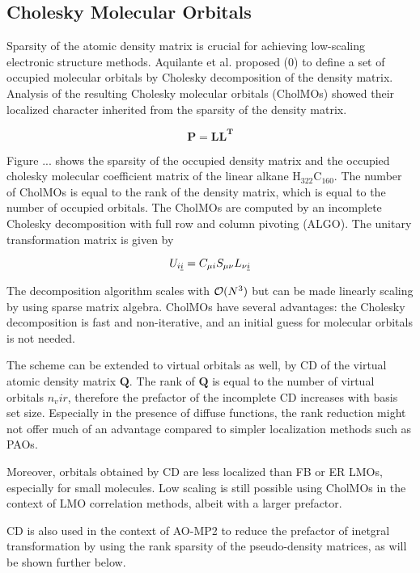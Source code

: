 \subsection{Cholesky Molecular Orbitals}

Sparsity of the atomic density matrix is crucial for achieving low-scaling electronic structure methods. Aquilante et al. proposed (0) to define a set of occupied molecular orbitals by Cholesky decomposition of the density matrix. Analysis of the resulting Cholesky molecular orbitals (CholMOs) showed their localized character inherited from the sparsity of the density matrix.

\begin{equation}
\mathbf{P} = \mathbf{LL^T}
\end{equation}

Figure ... shows the sparsity of the occupied density matrix and the occupied cholesky molecular coefficient matrix of the linear alkane H$_{322}$C$_{160}$. The number of CholMOs is equal to the rank of the density matrix, which is equal to the number of occupied orbitals. The CholMOs are computed by an incomplete Cholesky decomposition with full row and column pivoting  (ALGO). The unitary transformation matrix is given by

\begin{equation}
U_{i\underline{i}} = C_{\mu i} S_{\mu \nu} L_{\nu \underline{i}}
\end{equation}

The decomposition algorithm scales with $\mathcal{O}(N^{3})$ but can be made linearly scaling by using sparse matrix algebra. CholMOs have several advantages: the Cholesky decomposition is fast and non-iterative, and an initial guess for molecular orbitals is not needed. 

The scheme can be extended to virtual orbitals as well, by CD of the virtual atomic density matrix $\mathbf{Q}$. The rank of $\mathbf{Q}$ is equal to the number of virtual orbitals $n_vir$, therefore the prefactor of the incomplete CD increases with basis set size. Especially in the presence of diffuse functions, the rank reduction might not offer much of an advantage compared to simpler localization methods such as PAOs.  

Moreover, orbitals obtained by CD are less localized than FB or ER LMOs, especially for small molecules. Low scaling is still possible using CholMOs in the context of LMO correlation methods, albeit with a larger prefactor.

CD is also used in the context of AO-MP2 to reduce the prefactor of inetgral transformation by using the rank sparsity of the pseudo-density matrices, as will be shown further below.

